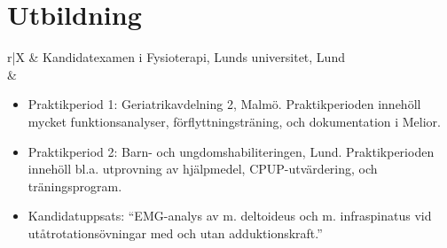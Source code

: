 \documentclass[11pt,a4paper]{article}
\begin{document}
\section{Utbildning}
\hspace{-4pt}
\begin{tabularx}{\textwidth}{r|X}	
	& Kandidatexamen i Fysioterapi, Lunds universitet, Lund\\
	&\footnotesize{\vspace{-5pt}
		 \begin{itemize}[leftmargin=10pt, topsep=-12.5pt]

		\item Praktikperiod 1: Geriatrikavdelning 2, Malmö. Praktikperioden innehöll mycket funktionsanalyser, förflyttningsträning, och dokumentation i Melior. 
		
		\item Praktikperiod 2: Barn- och ungdomshabiliteringen, Lund. Praktikperioden innehöll bl.a. utprovning av hjälpmedel, CPUP-utvärdering, och träningsprogram.
		
		\item Kandidatuppsats: ``EMG-analys av m. deltoideus och m. infraspinatus vid utåt\-rotations\-övningar med och utan adduktionskraft.''
		\end{itemize}\vspace{-30pt} 
	}\\
	 \\
\end{tabularx}

\end{document}
